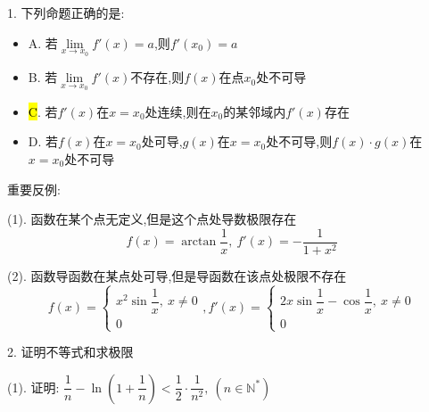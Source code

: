 1. 下列命题正确的是:  
\begin{itemize}
	\item A. 若$\lim\limits_{x\to x_{0}}f'(x)=a$,则$f'(x_{0})=a$
	\item B. 若$\lim\limits_{x\to x_{0}}f'(x)$不存在,则$f(x)$在点$x_{0}$处不可导
	\item \hl{C}. 若$f'(x)$在$x=x_{0}$处连续,则在$x_{0}$的某邻域内$f'(x)$存在
	\item D. 若$f(x)$在$x=x_{0}$处可导,$g(x)$在$x=x_{0}$处不可导,则$f(x)\cdot g(x)$在$x=x_{0}$处不可导
\end{itemize}
\begin{solution}

	重要反例:  
	
	(1). 函数在某个点无定义,但是这个点处导数极限存在
	$$f(x)=\arctan\dfrac{1}{x},\ f'(x)=-\dfrac{1}{1+x^2}$$
	
	(2). 函数导函数在某点处可导,但是导函数在该点处极限不存在
	$$f(x)=\left\lbrace
	\begin{array}{l}
		x^2\sin\dfrac{1}{x},\ x\neq 0\\
		0
	\end{array}
	\right. ,f'(x)=\left\lbrace
	\begin{array}{l}
		2x\sin\dfrac{1}{x}-\cos\dfrac{1}{x},\ x\neq 0\\
		0
	\end{array}
	\right. $$
\end{solution}

2. 证明不等式和求极限

(1). 证明:  $\dfrac{1}{n}-\ln(1+\dfrac{1}{n})<\dfrac{1}{2}\cdot\dfrac{1}{n^2},\ (n\in\mathbb{N}^{*})$

